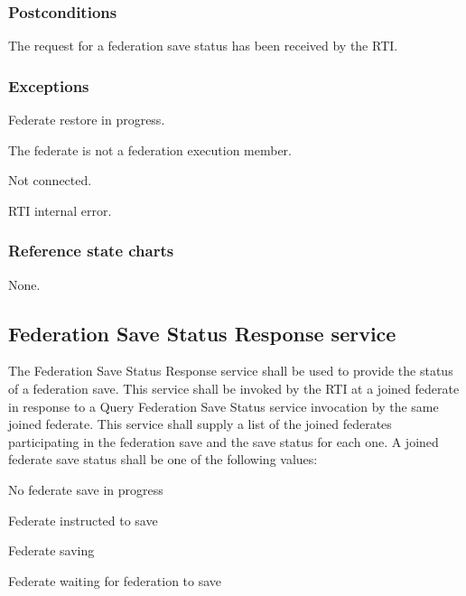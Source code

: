 \subsubsection{Postconditions}

\begin{stdalphalist}
    \item The request for a federation save status has been received by the RTI.
\end{stdalphalist}

\subsubsection{Exceptions}

\begin{stdalphalist}
    \item Federate restore in progress.
    \item The federate is not a federation execution member.
    \item Not connected.
    \item RTI internal error.
\end{stdalphalist}

\subsubsection{Reference state charts}

\begin{stdalphalist}
    \item None.
\end{stdalphalist}

\subsection{Federation Save Status Response \rtiinitiated{} service}

The Federation Save Status Response \rtiinitiated{} service shall be used to provide the status of a federation save. This service shall be invoked by the RTI at a joined federate in response to a Query Federation Save Status service invocation by the same joined federate. This service shall supply a list of the joined federates participating in the federation save and the save status for each one. A joined federate save status shall be one of the following values:

\begin{stddashlist}
    \item No federate save in progress
    \item Federate instructed to save
    \item Federate saving
    \item Federate waiting for federation to save
\end{stddashlist}

